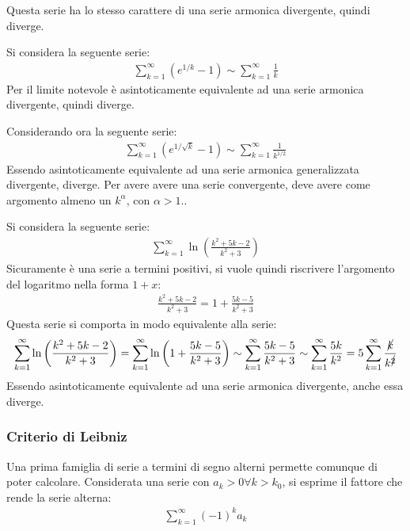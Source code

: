 \documentclass{article}
\numberwithin{equation}{subsection}
\begin{document}
Questa serie ha lo stesso carattere di una serie armonica divergente, quindi diverge. 

Si considera la seguente serie:
\begin{gather*}
    \displaystyle\sum_{k=1}^\infty\left(e^{1/k}-1\right)\sim\sum_{k=1}^\infty\frac{1}{k}
\end{gather*}
Per il limite notevole è asintoticamente equivalente ad una serie armonica divergente, quindi diverge. 

Considerando ora la seguente serie:
\begin{gather*}
    \displaystyle\sum_{k=1}^\infty\left(e^{1/\sqrt{k}}-1\right)\sim\sum_{k=1}^\infty\frac{1}{k^{1/2}}
\end{gather*}
Essendo asintoticamente equivalente ad una serie armonica generalizzata divergente, diverge. 
Per avere avere una serie convergente, deve avere come argomento almeno un $k^\alpha$, con $\alpha>1$.. 


Si considera la seguente serie:
\begin{gather*}
    \displaystyle\sum_{k=1}^\infty\ln\left(\frac{k^2+5k-2}{k^2+3}\right)
\end{gather*}
Sicuramente è una serie a termini positivi, si vuole quindi riscrivere l'argomento del logaritmo nella forma $1+x$:
\begin{gather*}
    \displaystyle\frac{k^2+5k-2}{k^2+3}=1+\frac{5k-5}{k^2+3}
\end{gather*}
Questa serie si comporta in modo equivalente alla serie:
\begin{gather*}
    \displaystyle\sum_{k=1}^\infty\ln\left(\frac{k^2+5k-2}{k^2+3}\right)=
    \displaystyle\sum_{k=1}^\infty\ln\left(1+\frac{5k-5}{k^2+3}\right)\sim\sum_{k=1}^\infty\frac{5k-5}{k^2+3}\sim\sum_{k=1}^\infty\frac{5k}{k^2}=5\sum_{k=1}^\infty\frac{\cancel{k}}{k^{\cancel{2}}}
\end{gather*}
Essendo asintoticamente equivalente ad una serie armonica divergente, anche essa diverge. 

\subsubsection{Criterio di Leibniz}

Una prima famiglia di serie a termini di segno alterni permette comunque di poter calcolare. Considerata una serie con $a_k>0\forall k>k_0$, si esprime il fattore che rende la serie alterna:
\begin{gather*}
    \displaystyle\sum_{k=1}^\infty(-1)^ka_k
\end{gather*}
\end{document}
